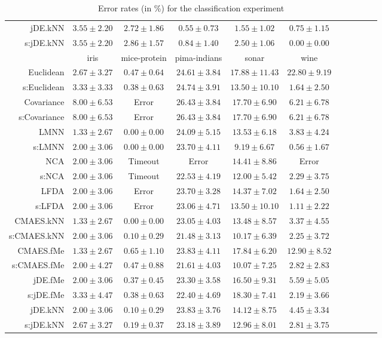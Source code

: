\begin{table}[ht]
{\begin{tabular}{rcccccccccc}
jDE.kNN & $3.55\pm2.20$ & $2.72\pm1.86$ & $0.55\pm0.73$ & $1.55\pm1.02$ & $0.75\pm1.15$ \\
s:jDE.kNN & $3.55\pm2.20$ & $2.86\pm1.57$ & $0.84\pm1.40$ & $2.50\pm1.06$ & $\bm{0.00\pm0.00}$ \\
\midrule
& \multicolumn{1}{c}{iris} & \multicolumn{1}{c}{mice-protein} & \multicolumn{1}{c}{pima-indians} & \multicolumn{1}{c}{sonar} & \multicolumn{1}{c}{wine} \\ 
\midrule
Euclidean & $2.67\pm3.27$ & $0.47\pm0.64$ & $24.61\pm3.84$ & $17.88\pm11.43$ & $22.80\pm9.19$ \\
s:Euclidean & $3.33\pm3.33$ & $0.38\pm0.63$ & $24.74\pm3.91$ & $13.50\pm10.10$ & $1.64\pm2.50$ \\
Covariance & $8.00\pm6.53$ & Error  & $26.43\pm3.84$ & $17.70\pm6.90$ & $6.21\pm6.78$ \\
s:Covariance & $8.00\pm6.53$ & Error  & $26.43\pm3.84$ & $17.70\pm6.90$ & $6.21\pm6.78$ \\
LMNN & $\bm{1.33\pm2.67}$ & $\bm{0.00\pm0.00}$ & $24.09\pm5.15$ & $13.53\pm6.18$ & $3.83\pm4.24$ \\
s:LMNN & $2.00\pm3.06$ & $\bm{0.00\pm0.00}$ & $23.70\pm4.11$ & $\bm{9.19\pm6.67}$ & $\bm{0.56\pm1.67}$ \\
NCA & $2.00\pm3.06$ & Timeout  & Error  & $14.41\pm8.86$ & Error  \\
s:NCA & $2.00\pm3.06$ & Timeout  & $22.53\pm4.19$ & $12.00\pm5.42$ & $2.29\pm3.75$ \\
LFDA & $2.00\pm3.06$ & Error  & $23.70\pm3.28$ & $14.37\pm7.02$ & $1.64\pm2.50$ \\
s:LFDA & $2.00\pm3.06$ & Error  & $23.06\pm4.71$ & $13.50\pm10.10$ & $1.11\pm2.22$ \\
CMAES.kNN & $\bm{1.33\pm2.67}$ & $\bm{0.00\pm0.00}$ & $23.05\pm4.03$ & $13.48\pm8.57$ & $3.37\pm4.55$ \\
s:CMAES.kNN & $2.00\pm3.06$ & $0.10\pm0.29$ & $\bm{21.48\pm3.13}$ & $10.17\pm6.39$ & $2.25\pm3.72$ \\
CMAES.fMe & $\bm{1.33\pm2.67}$ & $0.65\pm1.10$ & $23.83\pm4.11$ & $17.84\pm6.20$ & $12.90\pm8.52$ \\
s:CMAES.fMe & $2.00\pm4.27$ & $0.47\pm0.88$ & $21.61\pm4.03$ & $10.07\pm7.25$ & $2.82\pm2.83$ \\
jDE.fMe & $2.00\pm3.06$ & $0.37\pm0.45$ & $23.30\pm3.58$ & $16.50\pm9.31$ & $5.59\pm5.05$ \\
s:jDE.fMe & $3.33\pm4.47$ & $0.38\pm0.63$ & $22.40\pm4.69$ & $18.30\pm7.41$ & $2.19\pm3.66$ \\
jDE.kNN & $2.00\pm3.06$ & $0.10\pm0.29$ & $23.83\pm3.76$ & $14.12\pm8.75$ & $4.45\pm3.34$ \\
s:jDE.kNN & $2.67\pm3.27$ & $0.19\pm0.37$ & $23.18\pm3.89$ & $12.96\pm8.01$ & $2.81\pm3.75$ \\


\bottomrule
\end{tabular}
}
\caption{Error rates (in \%) for the classification experiment} \label{tab:error-rates}
\end{table}
